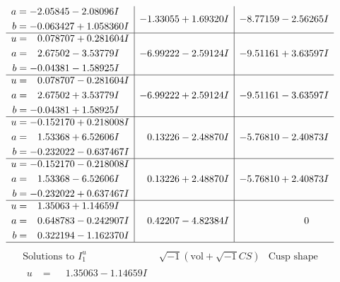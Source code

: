 \documentclass[1p]{elsarticle_modified}
\theoremstyle{definition}
\newcommand{\I}{\sqrt{-1}}
\begin{document}
$$\begin{array}{c|c|c}
\begin{aligned}
a &= -2.05845 - 2.08096 I \\
b &= -0.063427 + 1.058360 I\end{aligned}
 & -1.33055 + 1.69320 I & -8.77159 - 2.56265 I \\ \hline\begin{aligned}
u &= \phantom{-}0.078707 + 0.281604 I \\
a &= \phantom{-}2.67502 - 3.53779 I \\
b &= -0.04381 - 1.58925 I\end{aligned}
 & -6.99222 - 2.59124 I & -9.51161 + 3.63597 I \\ \hline\begin{aligned}
u &= \phantom{-}0.078707 - 0.281604 I \\
a &= \phantom{-}2.67502 + 3.53779 I \\
b &= -0.04381 + 1.58925 I\end{aligned}
 & -6.99222 + 2.59124 I & -9.51161 - 3.63597 I \\ \hline\begin{aligned}
u &= -0.152170 + 0.218008 I \\
a &= \phantom{-}1.53368 + 6.52606 I \\
b &= -0.232022 - 0.637467 I\end{aligned}
 & \phantom{-}0.13226 - 2.48870 I & -5.76810 - 2.40873 I \\ \hline\begin{aligned}
u &= -0.152170 - 0.218008 I \\
a &= \phantom{-}1.53368 - 6.52606 I \\
b &= -0.232022 + 0.637467 I\end{aligned}
 & \phantom{-}0.13226 + 2.48870 I & -5.76810 + 2.40873 I \\ \hline\begin{aligned}
u &= \phantom{-}1.35063 + 1.14659 I \\
a &= \phantom{-}0.648783 - 0.242907 I \\
b &= \phantom{-}0.322194 - 1.162370 I\end{aligned}
 & \phantom{-}0.42207 - 4.82384 I & \phantom{-0.000000 } 0\\
 \hline 
 \end{array}$$\newpage$$\begin{array}{c|c|c}  
\text{Solutions to }I^u_{1}& \I (\text{vol} + \sqrt{-1}CS) & \text{Cusp shape}\\
 \hline 
\begin{aligned}
u &= \phantom{-}1.35063 - 1.14659 I \\

\end{aligned}
\end{array}$$
\end{document}
